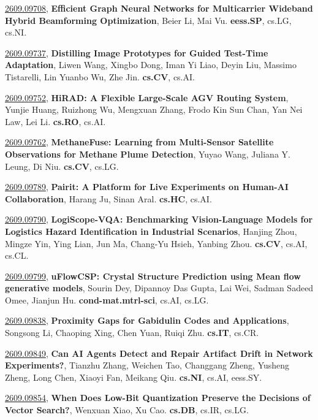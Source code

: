\documentclass[9pt, a4paper]{article}
\theoremstyle{plain}
\theoremstyle{definition}
\theoremstyle{remark}
\newcommand{\arxivwithtarget}[3]{\hypertarget{#1}{}\href{https://arxiv.org/abs/#1}{#1}, \textbf{\textcolor{arxivblue}{#2}}, #3. }
\begin{document}
\arxivwithtarget{2609.09708}{Efficient Graph Neural Networks for Multicarrier Wideband Hybrid Beamforming Optimization}{Beier Li, Mai Vu}\textbf{eess.SP}, cs.LG, cs.NI.



\arxivwithtarget{2609.09737}{Distilling Image Prototypes for Guided Test-Time Adaptation}{Liwen Wang, Xingbo Dong, Iman Yi Liao, Deyin Liu, Massimo Tistarelli, Lin Yuanbo Wu, Zhe Jin}\textbf{cs.CV}, cs.AI.



\arxivwithtarget{2609.09752}{HiRAD: A Flexible Large-Scale AGV Routing System}{Yunjie Huang, Ruizhong Wu, Mengxuan Zhang, Frodo Kin Sun Chan, Yan Nei Law, Lei Li}\textbf{cs.RO}, cs.AI.



\arxivwithtarget{2609.09762}{MethaneFuse: Learning from Multi-Sensor Satellite Observations for Methane Plume Detection}{Yuyao Wang, Juliana Y. Leung, Di Niu}\textbf{cs.CV}, cs.LG.



\arxivwithtarget{2609.09789}{Pairit: A Platform for Live Experiments on Human-AI Collaboration}{Harang Ju, Sinan Aral}\textbf{cs.HC}, cs.AI.



\arxivwithtarget{2609.09790}{LogiScope-VQA: Benchmarking Vision-Language Models for Logistics Hazard Identification in Industrial Scenarios}{Hanjing Zhou, Mingze Yin, Ying Lian, Jun Ma, Chang-Yu Hsieh, Yanbing Zhou}\textbf{cs.CV}, cs.AI, cs.CL.



\arxivwithtarget{2609.09799}{uFlowCSP: Crystal Structure Prediction using Mean flow generative models}{Sourin Dey, Dipannoy Das Gupta, Lai Wei, Sadman Sadeed Omee, Jianjun Hu}\textbf{cond-mat.mtrl-sci}, cs.AI, cs.LG.



\arxivwithtarget{2609.09838}{Proximity Gaps for Gabidulin Codes and Applications}{Songsong Li, Chaoping Xing, Chen Yuan, Ruiqi Zhu}\textbf{cs.IT}, cs.CR.



\arxivwithtarget{2609.09849}{Can AI Agents Detect and Repair Artifact Drift in Network Experiments?}{Tianzhu Zhang, Weichen Tao, Changgang Zheng, Yusheng Zheng, Long Chen, Xiaoyi Fan, Meikang Qiu}\textbf{cs.NI}, cs.AI, eess.SY.



\arxivwithtarget{2609.09854}{When Does Low-Bit Quantization Preserve the Decisions of Vector Search?}{Wenxuan Xiao, Xu Cao}\textbf{cs.DB}, cs.IR, cs.LG.
\end{document}
